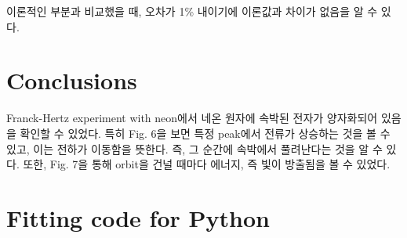 \documentclass[a4paper, 10pt, nanum]{CSUniSchoolLabReport}
\begin{document}
	이론적인 부분과 비교했을 때, 오차가 1\% 내이기에 이론값과 차이가 없음을 알 수 있다.


\section{Conclusions}

	Franck-Hertz experiment with neon에서 네온 원자에 속박된 전자가 양자화되어 있음을 확인할 수 있었다. 특히 Fig. 6을 보면 특정 peak에서 전류가 상승하는 것을 볼 수 있고, 이는 전하가 이동함을 뜻한다. 즉, 그 순간에 속박에서 풀려난다는 것을 알 수 있다. 또한, Fig. 7을 통해 orbit을 건널 때마다 에너지, 즉 빛이 방출됨을 볼 수 있었다.


\section{Fitting code for Python}




\end{document}
